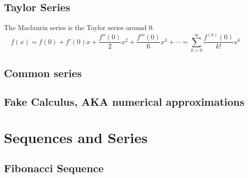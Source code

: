 \documentclass[fleqn,a4paper,11pt]{article}
\begin{document}
    \subsection{Taylor Series}

    The Maclaurin series is the Taylor series around \(0\).
    \begin{equation}
    f(x) = f(0) + f'(0) x + \frac{f''(0)} 2 x^2 + \frac{f'''(0)}{6}x^3 +\dotsb
      = \sum_{k=0}^\infty \frac{f^{(k)}(0)}{k!}x^k
    \end{equation}

    \subsection{Common series}

    \subsection{Fake Calculus, AKA numerical approximations}

    \section{Sequences and Series}

    \subsection{Fibonacci Sequence}
\end{document}
